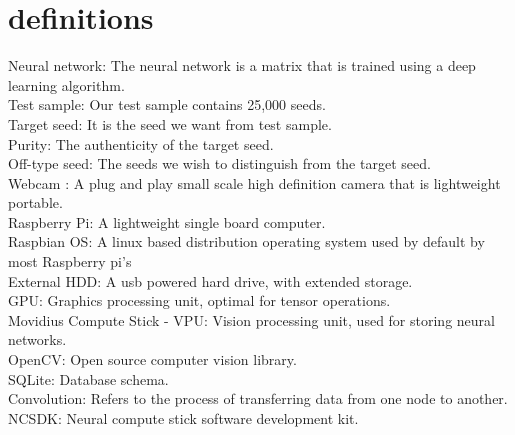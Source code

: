 \section{definitions}
Neural network: The neural network is a matrix that is trained using a deep learning algorithm. \\
Test sample: Our test sample contains 25,000 seeds. \\
Target seed: It is the seed we want from test sample. \\
Purity: The authenticity of the target seed. \\
Off-type seed: The seeds we wish to distinguish from the target seed. \\
Webcam : A plug and play small scale high definition camera that is lightweight portable. \\
Raspberry Pi: A lightweight single board computer. \\
Raspbian OS: A linux based distribution operating system used by default by most Raspberry pi's\\
External HDD: A usb powered hard drive, with extended storage. \\
GPU: Graphics processing unit, optimal for tensor operations. \\
Movidius Compute Stick - VPU: Vision processing unit, used for storing neural networks.\\
OpenCV: Open source computer vision library. \\
SQLite: Database schema. \\
Convolution: Refers to the process of transferring data from one node to another. \\
NCSDK: Neural compute stick software development kit. \\
